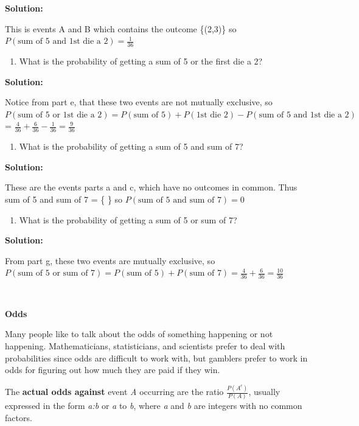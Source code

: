 \documentclass[]{book}
\providecommand{\tightlist}{%
  \setlength{\itemsep}{0pt}\setlength{\parskip}{0pt}}
\begin{document}
\textbf{Solution:}

This is events A and B which contains the outcome \{(2,3)\} so \(P(\text{sum of 5 and 1st die a 2})=\frac{1}{36}\)

\begin{enumerate}
\def\labelenumi{\alph{enumi}.}
\setcounter{enumi}{5}
\tightlist
\item
  What is the probability of getting a sum of 5 or the first die a 2?
\end{enumerate}

\textbf{Solution:}

Notice from part e, that these two events are not mutually
exclusive, so \(P(\text{sum of 5 or 1st die a 2})=P(\text{sum of 5})+P(\text{1st die 2})-P(\text{sum of 5 and 1st die a 2})\) = \(\frac{4}{36}+\frac{6}{36}-\frac{1}{36}=\frac{9}{36}\)

\begin{enumerate}
\def\labelenumi{\alph{enumi}.}
\setcounter{enumi}{6}
\tightlist
\item
  What is the probability of getting a sum of 5 and sum of 7?
\end{enumerate}

\textbf{Solution:}

These are the events parts a and c, which have no outcomes in common. Thus
sum of 5 and sum of 7 = \{ \} so \(P(\text{sum of 5 and sum of 7})=0\)

\begin{enumerate}
\def\labelenumi{\alph{enumi}.}
\setcounter{enumi}{7}
\tightlist
\item
  What is the probability of getting a sum of 5 or sum of 7?
\end{enumerate}

\textbf{Solution:}

From part g, these two events are mutually exclusive, so \(P(\text{sum of 5 or sum of 7})=P(\text{sum of 5})+P(\text{sum of 7})=\frac{4}{36}+\frac{6}{36}=\frac{10}{36}\)

\textbf{\\
}

\textbf{Odds}

Many people like to talk about the odds of something happening or not
happening. Mathematicians, statisticians, and scientists prefer to deal
with probabilities since odds are difficult to work with, but gamblers
prefer to work in odds for figuring out how much they are paid if they
win.

The \textbf{actual odds against} event \emph{A} occurring are the ratio \(\frac{P(A^c)}{P(A)}\), usually expressed in the form \emph{a:b} or \emph{a} to \emph{b}, where \emph{a} and \emph{b} are integers with no common factors.
\end{document}
